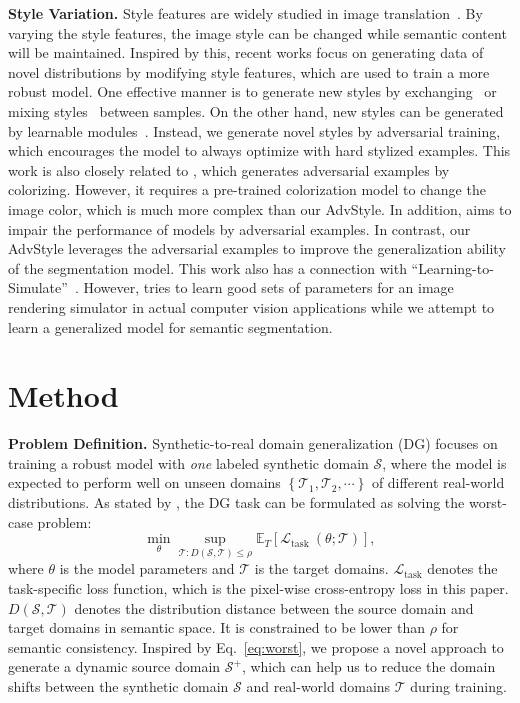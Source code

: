 \documentclass{article}
\begin{document}
\textbf{Style Variation.}
Style features are widely studied in image translation~\cite{adain, dumoulin2016learned}. By varying the style features, the image style can be changed while semantic content will be maintained.
Inspired by this, recent works focus on generating data of novel distributions by modifying style features, which are used to train a more robust model.
One effective manner is to generate new styles by 
exchanging~\cite{crossnorm,zhao2021source} or mixing styles~\cite{zhou2021mixstyle} between samples. 
On the other hand, new styles can be generated by learnable modules~\cite{wang2021L2D}. Instead, we generate novel styles by adversarial training, which encourages the model to always optimize with hard stylized examples. {This work is also closely related to \cite{bhattad2020unrestricted}, which generates adversarial examples by colorizing. However, it requires a pre-trained colorization model to change the image color, which is much more complex than our AdvStyle. In addition, \cite{bhattad2020unrestricted} aims to impair the performance of models by adversarial examples. In contrast, our AdvStyle leverages the adversarial examples to improve the generalization ability of the segmentation model. This work also has a connection with ``Learning-to-Simulate''~\cite{ruiz2019learning2simulate}. However, \cite{ruiz2019learning2simulate} tries to learn good sets of parameters for an image rendering simulator in actual computer vision applications while we attempt to learn a generalized model for semantic segmentation.}

\section{Method}
\label{sec:method}
\textbf{Problem Definition.} Synthetic-to-real domain generalization (DG) focuses on training a robust model with \textit{one} labeled synthetic domain $\mathcal{S}$, where the model is expected to perform well on  unseen domains $\left\{\mathcal{T}_1, \mathcal{T}_2, \cdots \right\}$ of different real-world distributions. As stated by \cite{volpi2018generalizing}, the DG task can be formulated as solving the worst-case problem:
\begin{equation}
\label{eq:worst}
\min _{\theta} \sup _{\mathcal{T}: D(\mathcal{S}, \mathcal{T}) \leq \rho} \mathbb{E}_{T}\left[\mathcal{L}_{\text {task }}(\theta ; \mathcal{T})\right],
\end{equation}
where $\theta$ is the model parameters and $\mathcal{T}$ is the target domains. $\mathcal{L}_{\text {task}}$ denotes the task-specific loss function, which is the pixel-wise cross-entropy loss in this paper. $D(\mathcal{S}, \mathcal{T})$ denotes the distribution distance between the source domain and target domains in semantic space. It is constrained to be lower than $\rho$ for semantic consistency.
Inspired by Eq.~\ref{eq:worst}, we propose a novel approach to generate a dynamic source domain $\mathcal{S}^{+}$, which can help us to reduce the domain shifts between the synthetic domain $\mathcal{S}$ and real-world domains $\mathcal{T}$ during training.
\end{document}

